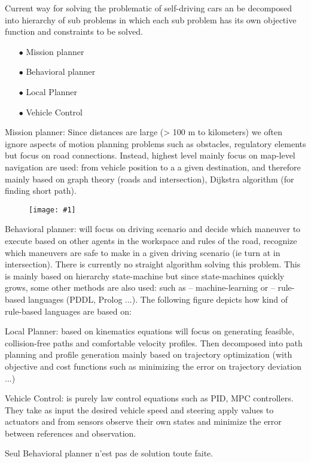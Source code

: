 \documentclass[french, a4paper, 10pt]{article}
\newcommand{\dessin}[4]{
\begin{figure}[htb]
\centering
\texttt{[image: \#1]}
\caption{#3}
\label{#4}
\end{figure}}
\begin{document}
Current way for solving the problematic of self-driving cars an be decomposed
into hierarchy of sub problems in which each sub problem has its own objective
function and constraints to be solved.

\begin{itemize}
\item[$\bullet$] Mission planner
\item[$\bullet$] Behavioral planner
\item[$\bullet$] Local Planner
\item[$\bullet$] Vehicle Control
\end{itemize}

Mission planner: Since distances are large (> 100 m to kilometers) we often
ignore aspects of motion planning problems such as obstacles, regulatory
elements but focus on road connections. Instead, highest level mainly focus on
map-level navigation are used: from vehicle position to a a given destination,
and therefore mainly based on graph theory (roads and intersection), Dijkstra
algorithm (for finding short path).

\dessin{pics/map}{0.40}{}{map}

Behavioral planner: will focus on driving scenario and decide which maneuver to
execute based on other agents in the workspace and rules of the road, recognize
which maneuvers are safe to make in a given driving scenario (ie turn at in
intersection). There is currently no straight algorithm solving this
problem. This is mainly based on hierarchy state-machine but since
state-machines quickly grows, some other methods are also used: such as –
machine-learning or – rule-based languages (PDDL, Prolog ...). The following
figure depicts how kind of rule-based languages are based on:

Local Planner: based on kinematics equations will focus on generating feasible,
collision-free paths and comfortable velocity profiles. Then decomposed into
path planning and profile generation mainly based on trajectory optimization
(with objective and cost functions such as minimizing the error on trajectory
deviation ...)

Vehicle Control: is purely law control equations such as PID, MPC
controllers. They take as input the desired vehicle speed and steering apply
values to actuators and from sensors observe their own states and minimize the
error between references and observation.


Seul Behavioral planner n'est pas de solution toute faite.
\end{document}
